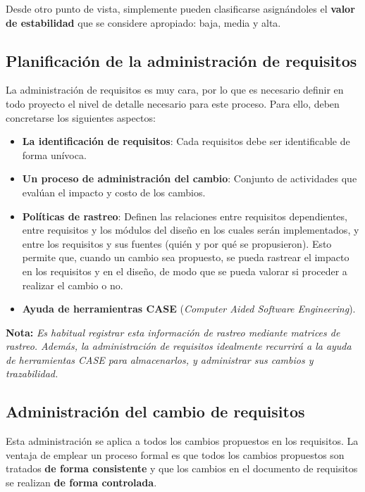 Desde otro punto de vista, simplemente pueden clasificarse asignándoles el \textbf{valor de estabilidad} que se considere apropiado: baja, media y alta.

\subsection{Planificación de la administración de requisitos}

La administración de requisitos es muy cara, por lo que es necesario definir en todo proyecto el nivel de detalle necesario para este proceso. Para ello, deben concretarse los siguientes aspectos:

\begin{itemize}
    \item \textbf{La identificación de requisitos}: Cada requisitos debe ser identificable de forma unívoca.
    \item \textbf{Un proceso de administración del cambio}: Conjunto de actividades que evalúan el impacto y costo de los cambios.
    \item \textbf{Políticas de rastreo}: Definen las relaciones entre requisitos dependientes, entre requisitos y los módulos del diseño en los cuales serán implementados, y entre los requisitos y sus fuentes (quién y por qué se propusieron). Esto permite que, cuando un cambio sea propuesto, se pueda rastrear el impacto en los requisitos y en el diseño, de modo que se pueda valorar si proceder a realizar el cambio o no.
    \item \textbf{Ayuda de herramientras CASE} (\textit{Computer Aided Software Engineering}).
\end{itemize}

\textbf{Nota:} \textit{Es habitual registrar esta información de rastreo mediante matrices de rastreo. Además, la administración de requisitos idealmente recurrirá a la ayuda de herramientas CASE para almacenarlos, y administrar sus cambios y trazabilidad.}

\subsection{Administración del cambio de requisitos}

Esta administración se aplica a todos los cambios propuestos en los requisitos. La ventaja de emplear un proceso formal es que todos los cambios propuestos son tratados \textbf{de forma consistente} y que los cambios en el documento de requisitos se realizan \textbf{de forma controlada}.\\

